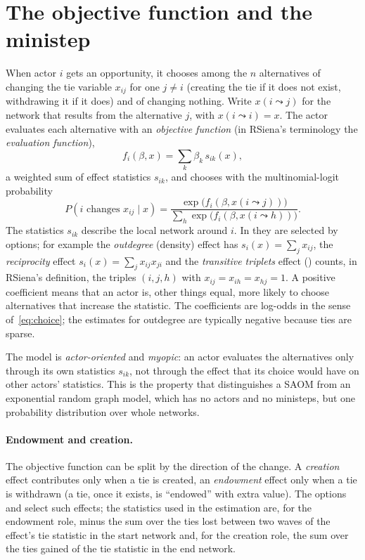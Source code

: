 \section{The objective function and the ministep}

When actor $i$ gets an opportunity, it chooses among the $n$ alternatives of changing the tie variable $x_{ij}$ for one $j\neq i$ (creating the tie if it does not exist, withdrawing it if it does) and of changing nothing. Write $x(i\leadsto j)$ for the network that results from the alternative $j$, with $x(i\leadsto i)=x$. The actor evaluates each alternative with an \emph{objective function} (in RSiena's terminology the \emph{evaluation function}),
\begin{equation}
  f_i(\beta,x)=\sum_k \beta_k\, s_{ik}(x),
\end{equation}
a weighted sum of effect statistics $s_{ik}$, and chooses with the multinomial-logit probability
\begin{equation}
  P(i \text{ changes } x_{ij}\mid x) = \frac{\exp\bigl(f_i(\beta,x(i\leadsto j))\bigr)}{\sum_{h}\exp\bigl(f_i(\beta,x(i\leadsto h))\bigr)} .
  \label{eq:choice}
\end{equation}
The statistics $s_{ik}$ describe the local network around $i$. In \nwsaom{} they are selected by options; for example the \emph{outdegree} (density) effect has $s_{i}(x)=\sum_j x_{ij}$, the \emph{reciprocity} effect $s_i(x)=\sum_j x_{ij}x_{ji}$ and the \emph{transitive triplets} effect () counts, in RSiena's definition, the triples $(i,j,h)$ with $x_{ij}=x_{ih}=x_{hj}=1$. A positive coefficient means that an actor is, other things equal, more likely to choose alternatives that increase the statistic. The coefficients are log-odds in the sense of~\eqref{eq:choice}; the estimates for outdegree are typically negative because ties are sparse.

The model is \emph{actor-oriented} and \emph{myopic}: an actor evaluates the alternatives only through its own statistics $s_{ik}$, not through the effect that its choice would have on other actors' statistics. This is the property that distinguishes a SAOM from an exponential random graph model, which has no actors and no ministeps, but one probability distribution over whole networks.

\paragraph{Endowment and creation.} The objective function can be split by the direction of the change. A \emph{creation} effect contributes only when a tie is created, an \emph{endowment} effect only when a tie is withdrawn (a tie, once it exists, is ``endowed'' with extra value). The options  and  select such effects; the statistics used in the estimation are, for the endowment role, minus the sum over the ties lost between two waves of the effect's tie statistic in the start network and, for the creation role, the sum over the ties gained of the tie statistic in the end network.

